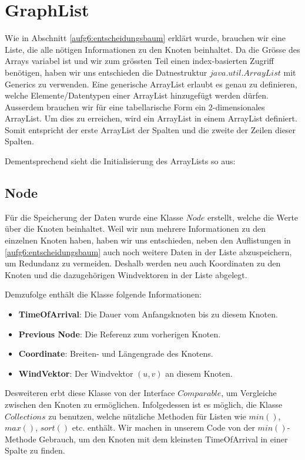 \section{GraphList}
Wie in Abschnitt \ref{aufg6:entscheidungsbaum} erklärt wurde, brauchen wir
eine Liste, die alle nötigen Informationen zu den Knoten beinhaltet. Da die
Grösse des Arrays variabel ist und wir zum grössten Teil einen index-basierten
Zugriff benötigen, haben wir uns entschieden die Datnestruktur
$java.util.ArrayList$ mit Generics zu verwenden. Eine generische ArrayList
erlaubt es genau zu definieren, welche Elemente/Datentypen einer ArrayList
hinzugefügt werden dürfen. Ausserdem brauchen wir für eine tabellarische Form
ein 2-dimensionales ArrayList. Um dies zu erreichen, wird ein ArrayList in
einem ArrayList definiert. Somit entspricht der erste ArrayList der Spalten
und die zweite der Zeilen dieser Spalten.

Dementsprechend sieht die Initialisierung des ArrayLists so aus:



\subsection{Node}
Für die Speicherung der Daten wurde eine Klasse $Node$ erstellt, welche die
Werte über die Knoten beinhaltet. Weil wir nun mehrere Informationen zu den
einzelnen Knoten haben, haben wir uns entschieden, neben den Auflistungen in
\ref{aufg6:entscheidungsbaum} auch noch weitere Daten in der Liste
abzuspeichern, um Redundanz zu vermeiden. Deshalb werden neu auch Koordinaten
zu den Knoten und die dazugehörigen Windvektoren in der Liste abgelegt.

Demzufolge enthält die Klasse folgende Informationen:

\begin{itemize}
\item \textbf{TimeOfArrival}: Die Dauer vom Anfangsknoten bis zu diesem Knoten.
\item \textbf{Previous Node}: Die Referenz zum vorherigen Knoten.
\item \textbf{Coordinate}: Breiten- und Längengrade des Knotens.
\item \textbf{WindVektor}: Der Windvektor $(u, v)$ an diesem Knoten.
\end{itemize}

Desweiteren erbt diese Klasse von der Interface $Comparable$, um Vergleiche
zwischen den Knoten zu ermöglichen. Infolgedessen ist es möglich, die Klasse
$Collections$ zu benutzen, welche nützliche Methoden für Listen wie $min()$,
$max()$, $sort()$ etc. enthält. Wir machen in unserem Code von der
$min()$-Methode Gebrauch, um den Knoten mit dem kleinsten TimeOfArrival in
einer Spalte zu finden.

